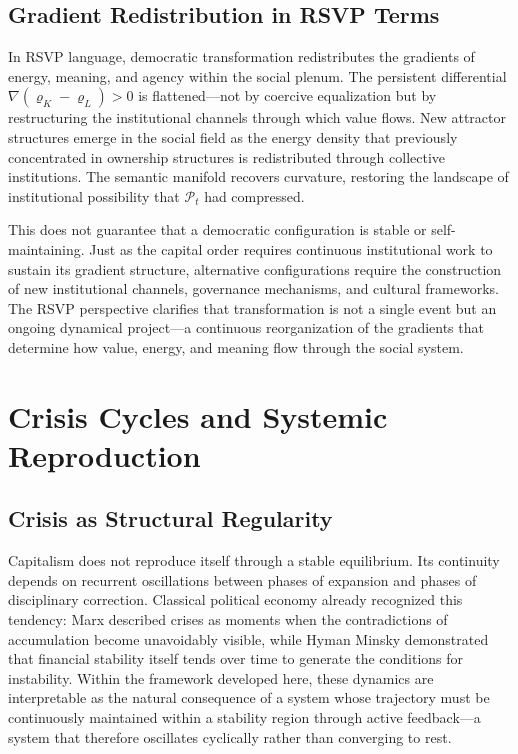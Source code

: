 \documentclass[12pt,a4paper]{article}
\theoremstyle{definition}
\theoremstyle{remark}
\begin{document}
\subsection{Gradient Redistribution in RSVP Terms}

In RSVP language, democratic transformation redistributes the gradients of energy, meaning, and agency within the social plenum. The persistent differential $\nabla(\varrho_K - \varrho_L) > 0$ is flattened---not by coercive equalization but by restructuring the institutional channels through which value flows. New attractor structures emerge in the social field as the energy density that previously concentrated in ownership structures is redistributed through collective institutions. The semantic manifold recovers curvature, restoring the landscape of institutional possibility that $\mathcal{P}_t$ had compressed.

This does not guarantee that a democratic configuration is stable or self-maintaining. Just as the capital order requires continuous institutional work to sustain its gradient structure, alternative configurations require the construction of new institutional channels, governance mechanisms, and cultural frameworks. The RSVP perspective clarifies that transformation is not a single event but an ongoing dynamical project---a continuous reorganization of the gradients that determine how value, energy, and meaning flow through the social system.

\section{Crisis Cycles and Systemic Reproduction}
\label{sec:crisis_cycles}

\subsection{Crisis as Structural Regularity}

Capitalism does not reproduce itself through a stable equilibrium. Its continuity depends on recurrent oscillations between phases of expansion and phases of disciplinary correction. Classical political economy already recognized this tendency: Marx described crises as moments when the contradictions of accumulation become unavoidably visible, while Hyman Minsky demonstrated that financial stability itself tends over time to generate the conditions for instability. Within the framework developed here, these dynamics are interpretable as the natural consequence of a system whose trajectory must be continuously maintained within a stability region through active feedback---a system that therefore oscillates cyclically rather than converging to rest.
\end{document}
